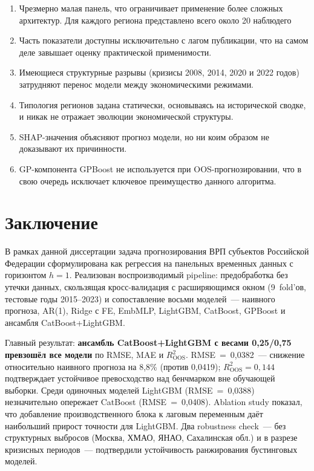 \documentclass[12pt,a4paper]{article}
\begin{document}
\begin{enumerate}
  \item Чрезмерно малая панель, что
        ограничивает применение более сложных архитектур. Для каждого региона представлено всего около 20 наблюдего
  \item Часть показатели доступны исключительно с лагом публикации, что на самом деле завышает
        оценку практической применимости.
  \item Имеющиеся структурные разрывы (кризисы 2008, 2014, 2020 и 2022 годов) затрудняют
        перенос модели между экономическими режимами.
  \item Типология регионов задана статически, основываясь на исторической сводке, и никак не отражает эволюции
        экономической структуры.
  \item SHAP-значения объясняют прогноз модели, но ни коим образом не доказывают
        их причинности.
  \item GP-компонента GPBoost не используется при OOS-прогнозировании,
        что в свою очередь исключает ключевое преимущество
        данного алгоритма.
\end{enumerate}

\section{Заключение}

В рамках данной диссертации задача прогнозирования ВРП субъектов Российской Федерации
сформулирована как регрессия на панельных временных данных с горизонтом
$h=1$. Реализован воспроизводимый pipeline: предобработка без утечки
данных, скользящая кросс-валидация с расширяющимся окном (9~fold'ов,
тестовые годы 2015--2023) и сопоставление восьми моделей~--- наивного
прогноза, AR(1), Ridge с FE, EmbMLP, LightGBM, CatBoost, GPBoost
и ансамбля CatBoost+LightGBM.

Главный результат: \textbf{ансамбль CatBoost+LightGBM с весами 0{,}25/0{,}75
превзошёл все модели} по RMSE, MAE и $R^2_{\mathrm{OOS}}$.
RMSE~=~0{,}0382~--- снижение относительно наивного прогноза на 8{,}8\%
(против 0{,}0419); $R^2_{\mathrm{OOS}} = 0{,}144$ подтверждает
устойчивое превосходство над бенчмарком вне обучающей выборки.
Среди одиночных моделей LightGBM (RMSE~=~0{,}0388) незначительно
опережает CatBoost (RMSE~=~0{,}0408). Ablation study показал, что
добавление производственного блока к лаговым переменным даёт
наибольший прирост точности для LightGBM. Два robustness check~---
без структурных выбросов (Москва, ХМАО, ЯНАО, Сахалинская обл.)
и в разрезе кризисных периодов~--- подтвердили устойчивость
ранжирования бустинговых моделей.
\end{document}
